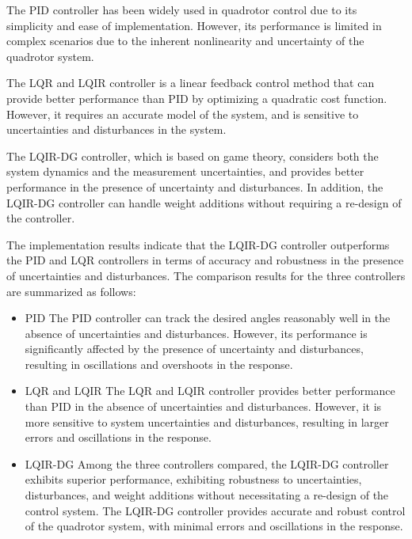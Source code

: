 \documentclass[3p,times]{elsarticle}
\begin{document}
The PID controller has been widely used in quadrotor control due to its simplicity and ease of implementation. However, its performance is limited in complex scenarios due to the inherent nonlinearity and uncertainty of the quadrotor system.

The LQR and LQIR controller is a linear feedback control method that can provide better performance than PID by optimizing a quadratic cost function. However, it requires an accurate model of the system, and is sensitive to uncertainties and disturbances in the system.

The LQIR-DG controller, which is based on game theory, considers both the system dynamics and the measurement uncertainties, and provides better performance in the presence of uncertainty and disturbances. In addition, the LQIR-DG controller can handle weight additions without requiring a re-design of the controller.

The implementation results indicate that the LQIR-DG controller outperforms the PID and LQR controllers in terms of accuracy and robustness in the presence of uncertainties and disturbances. The comparison results for the three controllers are summarized as follows:

\begin{itemize}
	\item PID \newline
	The PID controller can track the desired angles reasonably well in the absence of uncertainties and disturbances. However, its performance is significantly affected by the presence of uncertainty and disturbances, resulting in oscillations and overshoots in the response.
	\item LQR and LQIR \newline
	The LQR and LQIR controller provides better performance than PID in the absence of uncertainties and disturbances. However, it is more sensitive to system uncertainties and disturbances, resulting in larger errors and oscillations in the response.
	\item LQIR-DG \newline
	Among the three controllers compared, the LQIR-DG controller exhibits superior performance, exhibiting robustness to uncertainties, disturbances, and weight additions without necessitating a re-design of the control system. The LQIR-DG controller provides accurate and robust control of the quadrotor system, with minimal errors and oscillations in the response.
\end{itemize}
\end{document}
